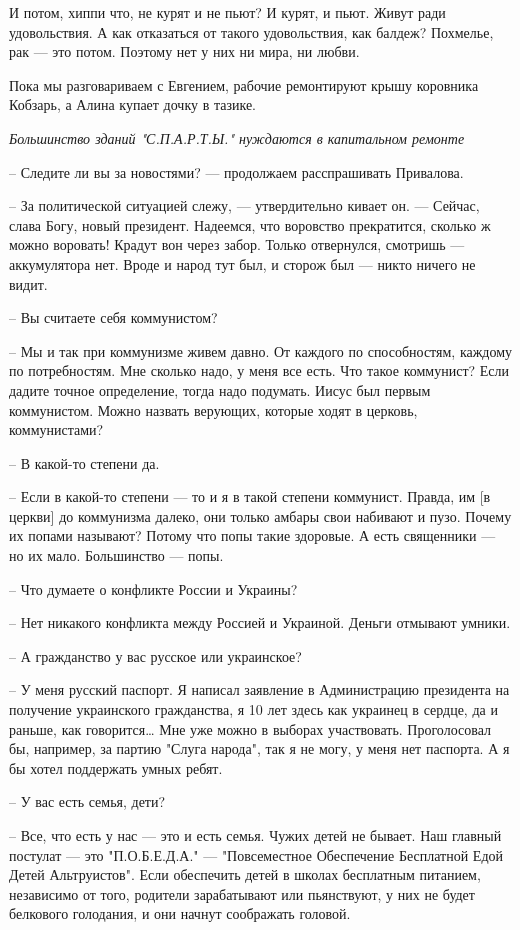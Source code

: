 И потом, хиппи что, не курят и не пьют? И курят, и пьют. Живут ради
удовольствия. А как отказаться от такого удовольствия, как балдеж? Похмелье,
рак --- это потом. Поэтому нет у них ни мира, ни любви.

Пока мы разговариваем с Евгением, рабочие ремонтируют крышу коровника Кобзарь,
а Алина купает дочку в тазике.

\emph{Большинство зданий "С.П.А.Р.Т.Ы." нуждаются в капитальном ремонте}

– Следите ли вы за новостями? --- продолжаем расспрашивать Привалова.

– За политической ситуацией слежу, --- утвердительно кивает он. --- Сейчас, слава
Богу, новый президент. Надеемся, что воровство прекратится, сколько ж можно
воровать! Крадут вон через забор. Только отвернулся, смотришь --- аккумулятора
нет. Вроде и народ тут был, и сторож был --- никто ничего не видит.

– Вы считаете себя коммунистом?

– Мы и так при коммунизме живем давно. От каждого по способностям, каждому по
потребностям. Мне сколько надо, у меня все есть. Что такое коммунист? Если
дадите точное определение, тогда надо подумать. Иисус был первым коммунистом.
Можно назвать верующих, которые ходят в церковь, коммунистами?

– В какой-то степени да.

– Если в какой-то степени --- то и я в такой степени коммунист. Правда, им [в
церкви] до коммунизма далеко, они только амбары свои набивают и пузо. Почему их
попами называют? Потому что попы такие здоровые. А есть священники --- но их
мало. Большинство --- попы.

– Что думаете о конфликте России и Украины?

– Нет никакого конфликта между Россией и Украиной. Деньги отмывают умники.

– А гражданство у вас русское или украинское?

– У меня русский паспорт. Я написал заявление в Администрацию президента на
получение украинского гражданства, я 10 лет здесь как украинец в сердце, да и
раньше, как говорится… Мне уже можно в выборах участвовать. Проголосовал бы,
например, за партию "Слуга народа", так я не могу, у меня нет паспорта. А я бы
хотел поддержать умных ребят. 

– У вас есть семья, дети?

– Все, что есть у нас --- это и есть семья. Чужих детей не бывает. Наш главный
постулат --- это "П.О.Б.Е.Д.А." --- "Повсеместное Обеспечение Бесплатной Едой Детей
Альтруистов". Если обеспечить детей в школах бесплатным питанием, независимо от
того, родители зарабатывают или пьянствуют, у них не будет белкового голодания,
и они начнут соображать головой. 

